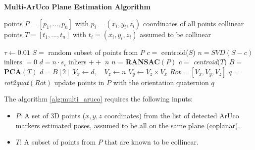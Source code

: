 \begin{algorithm}[H]
    \caption{\textbf{Multi-ArUco Plane Estimation Algorithm}}
    \label{alg:multi_aruco}
    \begin{algorithmic}[1]
    
    \Require points $P = \left[ p_1, \ldots, p_n \right]$ with $p_i = (x_i, y_i, z_i)$ coordinates of all points
    \Require collinear points $T = \left[t_1, \ldots, t_n \right]$ with $t_i = (x_i, y_i, z_i)$ assumed to be collinear
    
        \State $\tau \gets 0.01$ 
        \Repeat
            \State $S =$ random subset of points from $P$
            \State $c =$ centroid($S$) 
            \State $n = SVD(S - c)$  
            \State inliers $ = 0$ 
            \State $d = n \cdot s_i$ 
                 
                    \State inliers $++$
                \EndIf
            \EndFor
        \State \Return $n$ 
    \EndFunction
    \State
    \State $n$ = \textbf{RANSAC}$(P)$
    \State $c =$ \textit{centroid}($T$) 
    \State $B = $ \textbf{PCA}$(T)$ 
    \State $d = B[2]$ 
    \State $V_x \gets d, \quad V_z \gets n$
    \State $V_y \gets V_z \times V_x$ 
    \State $Rot = \left[V_x, V_y, V_z \right]$ 
    \State $q = $ \textit{rot2quat}$(Rot)$ 
    \State update points in $P$ with the orientation quaternion $q$
    \end{algorithmic}
\end{algorithm}

The algorithm \ref{alg:multi_aruco} requires the following inputs:
\begin{itemize}
    \item $P$: A set of 3D points ($x, y, z$ coordinates) from the list of detected ArUco markers estimated poses,
    assumed to be all on the same plane (coplanar).
    \item $T$: A subset of points from $P$ that are known to be collinear.
\end{itemize}

